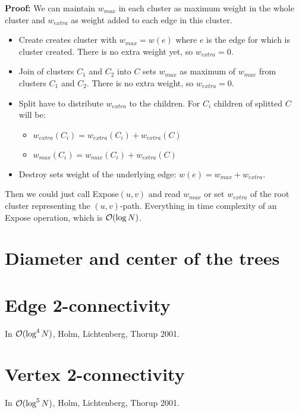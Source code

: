 \medskip\noindent
{\bf Proof:} We can maintain $w_{max}$ in each cluster as maximum weight in the
whole cluster and $w_{extra}$ as weight added to each edge in this cluster.

\begin{itemize}

\item {\sc Create} creates cluster with $w_{max}=w(e)$ where $e$ is the edge for
which is cluster created. There is no extra weight yet, so $w_{extra}=0$.

\item {\sc Join} of clusters $C_1$ and $C_2$ into $C$ sets $w_{max}$ as maximum
of $w_{max}$ from clusters $C_1$ and $C_2$. There is no extra weight, so $w_{extra}=0$.

\item {\sc Split} have to distribute $w_{extra}$ to the children. For $C_i$ children
of splitted $C$ will be:
	\begin{itemize}[$\circ$]
	\item $w_{extra}(C_i)=w_{extra}(C_i)+w_{extra}(C)$
	\item $w_{max}(C_i)=w_{max}(C_i)+w_{extra}(C)$
	\end{itemize}

\item {\sc Destroy} sets weight of the underlying edge: $w(e)=w_{max}+w_{extra}$.

\end{itemize}

Then we could just call {\sc Expose}$(u,v)$ and read $w_{max}$ or set $w_{extra}$
of the root cluster representing the $(u,v)$-path. Everything in time complexity
of an {\sc Expose} operation, which is ${\cal O}(\log N)$.


\section{Diameter and center of the trees}


\section{Edge 2-connectivity}

In ${\cal O}(\log^4 N)$, Holm, Lichtenberg, Thorup 2001.



\section{Vertex 2-connectivity}

In ${\cal O}(\log^5 N)$, Holm, Lichtenberg, Thorup 2001.

